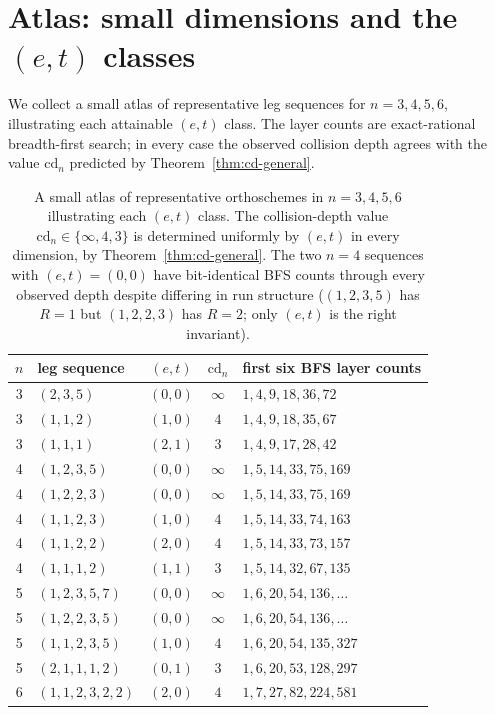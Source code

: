 \documentclass[11pt,a4paper]{article}
\theoremstyle{remark}
\theoremstyle{plain}
\begin{document}
\section{Atlas: small dimensions and the $(e, t)$ classes}\label{sec:atlas}

We collect a small atlas of representative leg sequences for
$n = 3, 4, 5, 6$, illustrating each attainable $(e, t)$ class.
The layer counts are exact-rational breadth-first search; in every
case the observed collision depth agrees with the value
$\mathrm{cd}_n$ predicted by Theorem~\ref{thm:cd-general}.

\begin{table}[ht!]
\centering
\small
\renewcommand{\arraystretch}{1.2}
\begin{tabular}{c l c c l}
\toprule
$n$ & leg sequence & $(e, t)$ & $\mathrm{cd}_n$ & first six BFS layer counts \\
\midrule
3 & $(2, 3, 5)$       & $(0, 0)$ & $\infty$ & $1, 4, 9, 18, 36, 72$ \\
3 & $(1, 1, 2)$       & $(1, 0)$ & $4$      & $1, 4, 9, 18, 35, 67$ \\
3 & $(1, 1, 1)$       & $(2, 1)$ & $3$      & $1, 4, 9, 17, 28, 42$ \\
\midrule
4 & $(1, 2, 3, 5)$    & $(0, 0)$ & $\infty$ & $1, 5, 14, 33, 75, 169$ \\
4 & $(1, 2, 2, 3)$    & $(0, 0)$ & $\infty$ & $1, 5, 14, 33, 75, 169$ \\
4 & $(1, 1, 2, 3)$    & $(1, 0)$ & $4$      & $1, 5, 14, 33, 74, 163$ \\
4 & $(1, 1, 2, 2)$    & $(2, 0)$ & $4$      & $1, 5, 14, 33, 73, 157$ \\
4 & $(1, 1, 1, 2)$    & $(1, 1)$ & $3$      & $1, 5, 14, 32, 67, 135$ \\
\midrule
5 & $(1, 2, 3, 5, 7)$    & $(0, 0)$ & $\infty$ & $1, 6, 20, 54, 136, \ldots$ \\
5 & $(1, 2, 2, 3, 5)$    & $(0, 0)$ & $\infty$ & $1, 6, 20, 54, 136, \ldots$ \\
5 & $(1, 1, 2, 3, 5)$    & $(1, 0)$ & $4$      & $1, 6, 20, 54, 135, 327$ \\
5 & $(2, 1, 1, 1, 2)$    & $(0, 1)$ & $3$      & $1, 6, 20, 53, 128, 297$ \\
\midrule
6 & $(1, 1, 2, 3, 2, 2)$ & $(2, 0)$ & $4$      & $1, 7, 27, 82, 224, 581$ \\
\bottomrule
\end{tabular}
\caption{A small atlas of representative orthoschemes in $n = 3, 4, 5, 6$
illustrating each $(e, t)$ class.  The collision-depth value
$\mathrm{cd}_n \in \{\infty, 4, 3\}$ is determined uniformly by
$(e, t)$ in every dimension, by Theorem~\ref{thm:cd-general}.  The
two $n = 4$ sequences with $(e, t) = (0, 0)$ have bit-identical
BFS counts through every observed depth despite differing in run
structure ($(1, 2, 3, 5)$ has $R = 1$ but $(1, 2, 2, 3)$ has $R = 2$; only $(e, t)$ is the right invariant).}
\label{tab:atlas}
\end{table}
\end{document}
